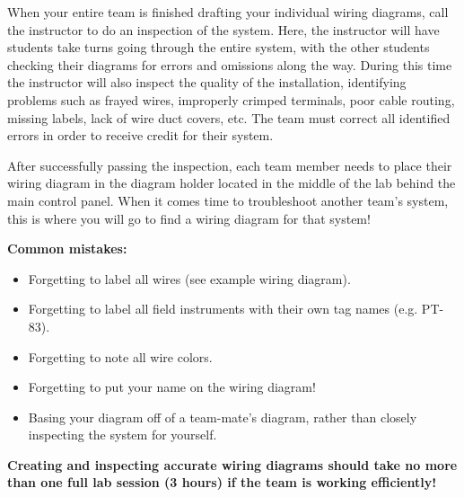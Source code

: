 When your entire team is finished drafting your individual wiring diagrams, call the instructor to do an inspection of the system.  Here, the instructor will have students take turns going through the entire system, with the other students checking their diagrams for errors and omissions along the way.  During this time the instructor will also inspect the quality of the installation, identifying problems such as frayed wires, improperly crimped terminals, poor cable routing, missing labels, lack of wire duct covers, etc.  The team must correct all identified errors in order to receive credit for their system.  

After successfully passing the inspection, each team member needs to place their wiring diagram in the diagram holder located in the middle of the lab behind the main control panel.  When it comes time to troubleshoot another team's system, this is where you will go to find a wiring diagram for that system!

\vskip 10pt

{\bf Common mistakes:}

\begin{itemize}
\item{} Forgetting to label all wires (see example wiring diagram).
\item{} Forgetting to label all field instruments with their own tag names (e.g. PT-83).
\item{} Forgetting to note all wire colors.
\item{} Forgetting to put your name on the wiring diagram!
\item{} Basing your diagram off of a team-mate's diagram, rather than closely inspecting the system for yourself.
\end{itemize}

\vskip 10pt

{\bf Creating and inspecting accurate wiring diagrams should take no more than one full lab session (3 hours) if the team is working efficiently!}

\filbreak

